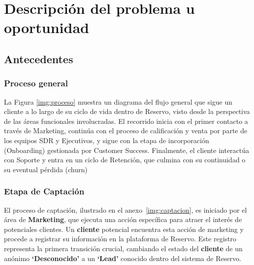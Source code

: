 

\section{Descripción del problema u oportunidad}

\subsection{Antecedentes}


\subsubsection{Proceso general}
La Figura \ref{img:proceso} muestra un diagrama del flujo general que sigue un cliente a lo largo de su ciclo de vida dentro de Reservo, visto desde la perspectiva de las áreas funcionales involucradas. El recorrido inicia con el primer contacto a través de Marketing, continúa con el proceso de calificación y venta por parte de los equipos SDR y Ejecutivos, y sigue con la etapa de incorporación (Onboarding) gestionada por Customer Success. Finalmente, el cliente interactúa con Soporte y entra en un ciclo de Retención, que culmina con su continuidad o su eventual pérdida (churn)



\subsubsection{Etapa de Captación}

El proceso de captación, ilustrado en el anexo~\ref{img:captacion}, es iniciado por el área de \textbf{Marketing}, que ejecuta una acción específica para atraer el interés de potenciales clientes. Un \textbf{cliente} potencial encuentra esta acción de marketing y procede a registrar su información en la plataforma de Reservo. Este registro representa la primera transición crucial, cambiando el estado del \textbf{cliente} de un anónimo \textbf{`Desconocido'} a un \textbf{`Lead'} conocido dentro del sistema de Reservo.


